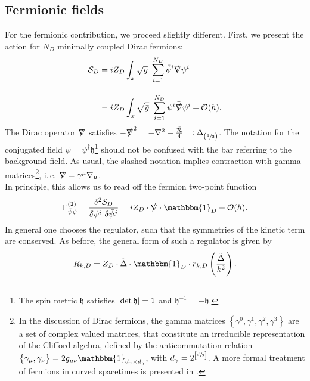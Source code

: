 \subsection{Fermionic  fields}
For the fermionic contribution, we  proceed slightly different. First, we present the action for $N_D$ minimally coupled Dirac fermions:
\begin{equation}
	\begin{aligned}
		\mathcal{S}_D &= iZ_D\int_x \sqrt{g} \ \sum\limits_{i=1}^{N_D}\bar{\psi}^{i}\slashed{\nabla}\psi^{i} \\[10pt]
		&=  iZ_D\int_x \sqrt{\bar{g}} \ \sum\limits_{i=1}^{N_D}\bar{\psi}^{i}\bar{\slashed{\nabla}}\psi^{i} + \mathcal{O}(h).
	\end{aligned}
\end{equation}
The Dirac operator $\slashed{\nabla}$ satisfies $-\slashed{\nabla}^2 = -\nabla^2 + \frac{\bar{\mathcal{R}}}{4} =: \Delta_{\left(\sfrac{1}{2}\right)}$.
The notation for the conjugated field $\bar{\psi} = \psi^{\dagger}\mathfrak{h}$\footnote{The spin metric $\mathfrak{h}$ satisfies $\abs{\operatorname{det} \mathfrak{h}} = 1$ and $\mathfrak{h}^{-1} = -\mathfrak{h}$.} should not be confused with the bar referring to the background field. As usual, the slashed notation implies contraction with gamma matrices\footnote{In the discussion of Dirac fermions, the gamma matrices $\left\{\gamma^0, \gamma^1, \gamma^2, \gamma^3\right\}$ are a set of complex valued matrices, that constitute an irreducible representation of the Clifford algebra, defined by the anticommutation relation $\left\{\gamma_{\mu}, \gamma_{\nu}\right\}= 2g_{\mu\nu} \mathbbm{1}_{d_{\gamma}\times d_{\gamma}}$, with $d_{\gamma} = 2^{\left[\sfrac{d}{2}\right]}$. A more formal treatment of fermions in curved spacetimes is presented in \cite{LippoldtPHD}.}, i.\,e. $\slashed{\nabla} = \gamma^{\mu}\nabla_{\mu}$.  \\
In principle, this allows us to read off the fermion two-point function
\begin{align}
	\Gamma^{(2)}_{\bar{\psi}\psi} = \frac{\delta^2 \mathcal{S}_D}{\delta \psi^{i}\ \delta \bar{\psi}^{j}} = iZ_D\cdot\slashed{\nabla}\cdot\mathbbm{1}_D + \mathcal{O}(h).
\end{align}
In general one chooses the regulator, such that the symmetries of the kinetic term are conserved. As before, the general form of such a regulator is given by
\begin{align}
	R_{k,D} = Z_D\cdot\tilde{\Delta}\cdot\mathbbm{1}_D\cdot r_{k, D}\left(\frac{\tilde{\Delta}}{k^2}\right).
\end{align} 
